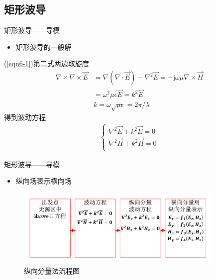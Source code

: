 \subsection{矩形波导}

\begin{frame}{矩形波导——导模}
    \begin{itemize}
        \item 矩形波导的一般解
    \end{itemize}
    (\ref{eqn6-1})第二式两边取旋度
    \begin{align*}
        \nabla\times\nabla\times\vec{E} & =\nabla(\nabla\cdot\vec{E})-\nabla^2\vec{E}=-\mathrm{j}\omega\mu\nabla\times\vec{H} \\
                                        & =\omega^2\mu\epsilon\vec{E}=k^2\vec{E}                                              \\
                                        & k=\omega\sqrt{\mu\epsilon}=2\pi/\lambda
    \end{align*}
    得到波动方程
    \begin{align}
        \begin{cases}
            \nabla^2\vec{E}+k^2\vec{E}=0 \\
            \nabla^2\vec{H}+k^2\vec{H}=0 \\
        \end{cases}\label{eqn6-2}
    \end{align}
\end{frame}

\begin{frame}{矩形波导——导模}
    \begin{itemize}
        \item 纵向场表示横向场
    \end{itemize}
    \centering
    \begin{figure}
        \includegraphics[width=10cm]{Cha6/fig6-2.pdf}
        \caption{纵向分量法流程图}   %
    \end{figure}
\end{frame}

